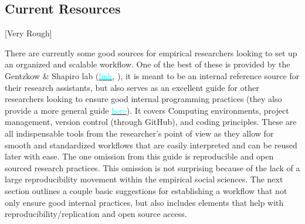 \documentclass[12pt]{article}
\begin{document}
\subsection{Current Resources}
\textcolor{BrickRed}{[Very Rough]}

There are currently some good sources for empirical researchers looking to set up an organized and scalable workflow. One of the best of these is provided by the Gentzkow \& Shapiro lab (\href{https://github.com/gslab-econ/ra-manual/wiki/Getting-Started}{\textcolor{cyan}{link}}, \cite{GSlab}), it is meant to be an internal reference source for their research assistants, but also serves as an excellent guide for other researchers looking to ensure good internal programming practices (they also provide a more general guide \href{https://web.stanford.edu/~gentzkow/research/CodeAndData.xhtml#magicparlabel-20}{\textcolor{cyan}{here}}). It covers Computing environments, project management, version control (through GitHub), and coding principles. These are all indispensable tools from the researcher's point of view as they allow for smooth and standardized workflows that are easily interpreted and can be reused later with ease. The one omission from this guide is reproducible and open sourced research practices. This omission is not surprising because of the lack of a large reproducibility movement within the empirical social sciences. The next section outlines a couple basic suggestions for establishing a workflow that not only ensure good internal practices, but also includes elements that help with reproducibility/replication and open source access.

\end{document}
